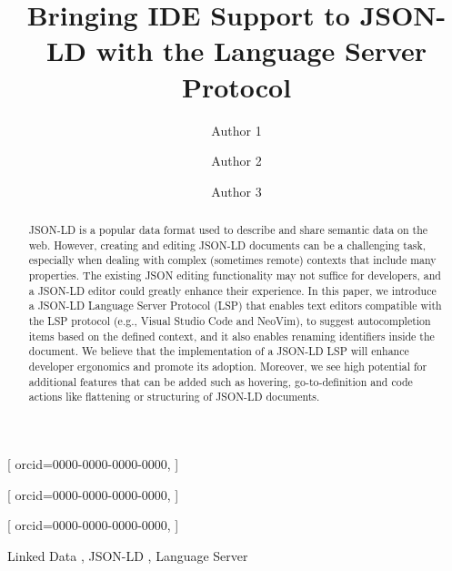 \documentclass[
]{ceurart}
\begin{document}



\title{Bringing IDE Support to JSON-LD with the Language Server Protocol}


\author[1]{Author 1}[%
orcid=0000-0000-0000-0000,
]
\author[1]{Author 2}[%
orcid=0000-0000-0000-0000,
]
\author[1]{Author 3}[%
orcid=0000-0000-0000-0000,
]
\address[1]{Some place on the world}


\begin{abstract}
  JSON-LD is a popular data format used to describe and share semantic data on the web.
  However, creating and editing JSON-LD documents can be a challenging task, especially when dealing with complex (sometimes remote) contexts that include many properties.
  The existing JSON editing functionality may not suffice for developers, and a JSON-LD editor could greatly enhance their experience.
  In this paper, we introduce a JSON-LD Language Server Protocol (LSP) that enables text editors compatible with the LSP protocol (e.g., Visual Studio Code and NeoVim), to suggest autocompletion items based on the defined context, and it also enables renaming identifiers inside the document.
  We believe that the implementation of a JSON-LD LSP will enhance developer ergonomics and promote its adoption.
  Moreover, we see high potential for additional features that can be added such as hovering, go-to-definition and code actions like flattening or structuring of JSON-LD documents.
\end{abstract}

\begin{keywords}
  Linked Data \sep 
  JSON-LD \sep
  Language Server
\end{keywords}
\end{document}

